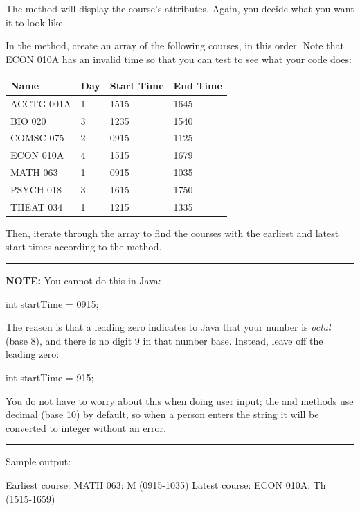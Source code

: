 \begin{exercise}
The  method will display the course's attributes. Again, you decide what you want it to look like.

In the  method, create an array of the following courses, in this order. Note that ECON 010A has an invalid time so that you can test to see what your code does:

\begin{tabular}{|l|l|l|l|}
\hline
Name & Day & Start Time & End Time \\ \hline
ACCTG 001A & 1 & 1515 & 1645 \\ \hline
BIO 020 & 3 & 1235 & 1540 \\ \hline
COMSC 075 & 2 & 0915 & 1125 \\ \hline
ECON 010A & 4 & 1515 & 1679 \\ \hline
MATH 063 & 1 & 0915 & 1035 \\ \hline
PSYCH 018 & 3 & 1615 & 1750 \\ \hline
THEAT 034 & 1 & 1215 & 1335\\ \hline
\end{tabular}

Then, iterate through the array to find the courses with the earliest and latest start times according to the  method.

\begin{minipage}[t]{0.8\textwidth}

\noindent\rule{\textwidth}{1pt}

{\bf NOTE:} You cannot do this in Java:
\begin{code}
int startTime = 0915;
\end{code}

The reason is that a leading zero indicates to Java that your number is {\em octal} (base 8), and there is no digit 9 in that number base. Instead, leave off the leading zero:

\begin{code}
int startTime = 915;
\end{code}

You do not have to worry about this when doing user input; the  and  methods use decimal (base 10) by default, so when a person enters the string  it will be converted to integer without an error.

\noindent\rule{\textwidth}{1pt}

\end{minipage}

Sample output:

\begin{stdout}
Earliest course: MATH 063: M (0915-1035)
Latest course: ECON 010A: Th (1515-1659)
\end{stdout}

\end{exercise}
